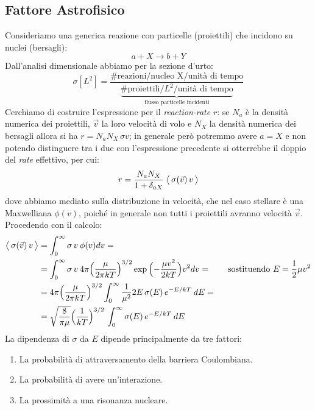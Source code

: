 \subsection{Fattore Astrofisico}\label{sec-SE}
Consideriamo una generica reazione con particelle (proiettili) che incidono su nuclei (bersagli):
$$a+X\to b+Y$$
Dall'analisi dimensionale abbiamo per la sezione d'urto:
$$\sigma[L^2] = \frac{\# \text{reazioni}/\text{nucleo X}/\text{unità di tempo}}{\underbrace{\# \text{proiettili}/L^2/\text{unità di tempo}}_\text{flusso particelle incidenti}}$$
Cerchiamo di costruire l'espressione per il \textit{reaction-rate} $r$: se $N_a$ è la densità numerica dei proiettili, $\vec{v}$ la loro velocità di volo e $N_X$ la densità numerica dei bersagli allora si ha $r = N_a N_X\, \sigma v$; in generale però potremmo avere $a=X$ e non potendo distinguere tra i due con l'espressione precedente si otterrebbe il doppio del \textit{rate} effettivo, per cui: 
$$r = \frac{N_a N_X}{1+\delta_{aX}}\: \bigl\langle\, \sigma(\vec{v})\, v\, \bigr\rangle$$
dove abbiamo mediato sulla distribuzione in velocità, che nel caso stellare è una Maxwelliana $\phi(v)$, poiché in generale non tutti i proiettili avranno velocità $\vec{v}$. Procedendo con il calcolo:
\begin{displaymath}
\begin{aligned}
\bigl\langle\, \sigma(\vec{v})\, v\, \bigr\rangle &= \int_0^\infty \sigma \, v \: \phi(v) dv = \\
&= \int_0^\infty \sigma \, v \: 4\pi \Bigl ( \frac{\mu}{2\pi kT} \Bigr )^{3/2} \exp{\Bigl ( -\frac{\mu v^2}{2kT} \Bigr )} v^2 dv = \qquad \text{sostituendo } E= \frac{1}{2}\mu v^2\\
&= 4\pi \Bigl ( \frac{\mu}{2\pi kT} \Bigr )^{3/2} \int_0^\infty \frac{1}{\mu^2} 2E\, \sigma(E) \, e^{-E/kT} \: dE =\\
&= \sqrt{\frac{8}{\pi \mu}} \Bigl ( \frac{1}{kT} \Bigr )^{3/2} \, \int_0^\infty \sigma(E) \, e^{-E/kT} \: dE
\end{aligned}
\end{displaymath}
La dipendenza di $\sigma$ da $E$ dipende principalmente da tre fattori:
\begin{enumerate}
    \item La probabilità di attraversamento della barriera Coulombiana.
    \item La probabilità di avere un'interazione.
    \item La prossimità a una risonanza nucleare.
\end{enumerate}
